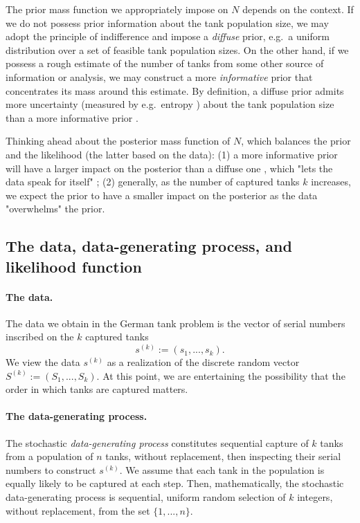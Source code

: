 \documentclass[11pt, oneside]{article}
\begin{document}
The prior mass function we appropriately impose on $N$ depends on the context. 
If we do not possess prior information about the tank population size, we may adopt the principle of indifference and impose a \emph{diffuse} prior, e.g.\ a uniform distribution over a set of feasible tank population sizes. 
On the other hand, if we possess a rough estimate of the number of tanks from some other source of information or analysis, we may construct a more \emph{informative} prior that concentrates its mass around this estimate. 
By definition, a diffuse prior admits more uncertainty (measured by e.g.\ entropy \cite{murphy2022probabilistic}) about the tank population size than a more informative prior \cite{van2021bayesian}.

Thinking ahead about the posterior mass function of $N$, which balances the prior and the likelihood (the latter based on the data): 
(1) a more informative prior will have a larger impact on the posterior than a diffuse one \cite{van2021bayesian}, which "lets the data speak for itself" \cite{downey2021think};
(2) generally, as the number of captured tanks $k$ increases, we expect the prior to have a smaller impact on the posterior \cite{downey2021think} as the data "overwhelms" the prior.


\subsection{The data, data-generating process, and likelihood function}
\paragraph{The data.} The data we obtain in the German tank problem is the vector of serial numbers inscribed on the $k$ captured tanks
\begin{equation}
	s^{(k)}:=(s_1,...,s_k).
\end{equation} 
We view the data $s^{(k)}$ as a realization of the discrete random vector $S^{(k)}:=(S_1, ..., S_k)$. At this point, we are entertaining the possibility that the order in which tanks are captured matters.

\paragraph{The data-generating process.}
The stochastic \emph{data-generating process} constitutes sequential capture of $k$ tanks from a population of $n$ tanks, without replacement, then inspecting their serial numbers to construct $s^{(k)}$.
We assume that each tank in the population is equally likely to be captured at each step.
Then, mathematically, the stochastic data-generating process is sequential, uniform random selection of $k$ integers, without replacement, from the set $\{1, ..., n\}$.
\end{document}

